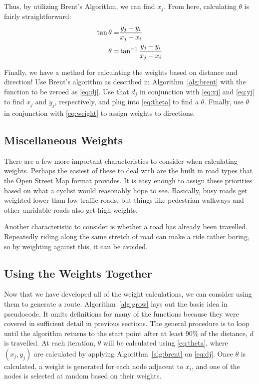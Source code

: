 \documentclass[twocolumn,11pt]{article}
\begin{document}
Thus, by utilizing Brent's Algorithm, we can find $x_j$. From here, calculating
$\theta$ is fairly straightforward:
\begin{align}
  \tan \theta = & \frac{y_j - y_i}{x_j-x_i} \notag \\
  \theta = & \tan^{-1} \frac{y_j - y_i}{x_j-x_i} \label{eq:theta}
\end{align}

Finally, we have a method for calculating the weights based on distance and
direction! Use Brent's algorithm as described in Algorithm~\ref{alg:brent}
with the function to be zeroed as \eqref{eq:dj}. Use that $d_j$ in conjunction
with \eqref{eq:xj} and \eqref{eq:yj} to find
$x_j$ and $y_j$, respectively, and plug into \eqref{eq:theta} to find a
$\theta$. Finally, use $\theta$ in conjunction with \eqref{eq:weight} to assign
weights to directions.

\subsection{Miscellaneous Weights}

There are a few more important characteristics to consider when calculating
weights. Perhaps the easiest of these to deal with are the built in road types
that the Open Street Map format provides. It is easy enough to assign these
priorities based on what a cyclist would reasonably hope to see. Basically,
busy roads get weighted lower than low-traffic roads, but things like
pedestrian walkways and other unridable roads also get high weights.

Another characteristic to consider is whether a road has already been
travelled. Repeatedly riding along the same stretch of road can make a ride
rather boring, so by weighting against this, it can be avoided.

\subsection{Using the Weights Together}

Now that we have developed all of the weight calculations, we can consider using
them to generate a route. Algorithm~\ref{alg:grow} lays out the basic idea in
pseudocode. It omits definitions for many of the functions because they were
covered in sufficient detail in previous sections. The general procedure is
to loop until the algorithm returns to the start point after at least 90\%
of the distance, $d$ is travelled. At each iteration, $\theta$ will be
calculated using \eqref{eq:theta}, where $(x_j,y_j)$ are calculated by applying
Algorithm~\ref{alg:brent} on \eqref{eq:dj}. Once $\theta$ is calculated, a
weight is generated for each node adjacent to $x_i$, and one of the nodes is
selected at random based on their weights.
\end{document}
